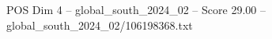 \begin{textsample}{POS Dim 4 – global\_south\_2024\_02 – Score 29.00 – global\_south\_2024\_02/106198368.txt}
\end{textsample}
